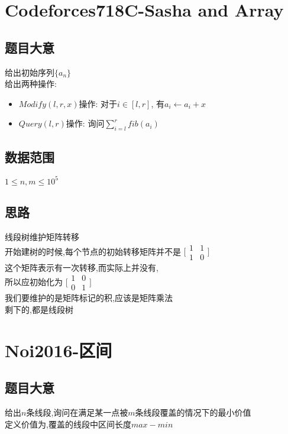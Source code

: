 \documentclass{ctexart}
\numberwithin{equation}{section}
\begin{document}
\begin{flushleft}
  \section{Codeforces718C-Sasha and Array}
  \subsection{题目大意}
  给出初始序列$\{a_n\}$\\
  给出两种操作:\\
  \begin{itemize}
  \item $Modify(l,r,x)$操作: 对于$i\in [l,r]$, 有$a_i \leftarrow a_i+x$
  \item $Query(l,r)$操作: 询问$\sum_{i=l}^r fib(a_i)$
  \end{itemize}
  \subsection{数据范围}
  $1\le n,m\le 10^5$\\
  \subsection{思路}
  线段树维护矩阵转移\\
  开始建树的时候,每个节点的初始转移矩阵并不是
  $\bigl[ \begin{smallmatrix} 1 & 1 \\ 1 & 0 \end{smallmatrix} \bigr]$\\ 
  这个矩阵表示有一次转移,而实际上并没有,\\
  所以应初始化为
  $\bigl[ \begin{smallmatrix} 1 & 0 \\ 0 & 1 \end{smallmatrix} \bigr]$\\
  我们要维护的是矩阵标记的积,应该是矩阵乘法\\
  剩下的,都是线段树\\
  \newpage

  \section{Noi2016-区间}
  \subsection{题目大意}
  给出$n$条线段,询问在满足某一点被$m$条线段覆盖的情况下的最小价值\\
  定义价值为,覆盖的线段中区间长度$max-min$\\

\end{flushleft}
\end{document}
